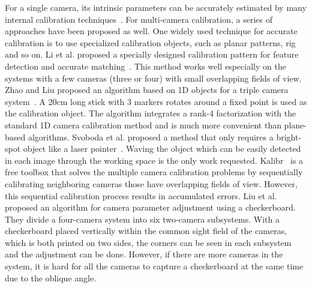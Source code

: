 For a single camera, its intrinsic parameters can be accurately estimated by many internal calibration techniques~\cite{zhang2000flexible,zhang2004camera}. 
For multi-camera calibration, a series of approaches have been proposed as well. 
One widely used technique for accurate calibration is to use specialized calibration objects, such as planar patterns, rig and so on.
%
Li et al. proposed a specially designed calibration pattern for feature detection and accurate matching~\cite{Li2013A}. %
This method works well especially on the systems with a few cameras (three or four) with small overlapping fields of view.
%
Zhao and Liu proposed an algorithm based on 1D objects for a triple camera system~\cite{zhao2008practical}. 
A 20cm long stick with 3 markers rotates around a fixed point is used as the calibration object. 
The algorithm integrates a rank-4 factorization with the standard 1D camera calibration method and is much more convenient than plane-based algorithms.
Svoboda et al. proposed a method that only requires a bright-spot object like a laser pointer~\cite{svoboda2005convenient}. 
Waving the object which can be easily detected in each image through the working space is the only work requested.
%
Kalibr~\cite{Maye2013Self} is a free toolbox that solves the multiple camera calibration problems by sequentially calibrating neighboring cameras those have overlapping fields of view.
%
However, this sequential calibration process results in accumulated errors. 
%
Liu et al.~\cite{Liu2015Algorithm} proposed an algorithm for camera parameter adjustment using a checkerboard. They divide a four-camera system into six two-camera subsystems. With a checkerboard placed vertically within the common sight field of the cameras, which is both printed on two sides, the corners can be seen in each subsystem and the adjustment can be done. However, if there are more cameras in the system, it is hard for all the cameras to capture a checkerboard at the same time due to the oblique angle.


